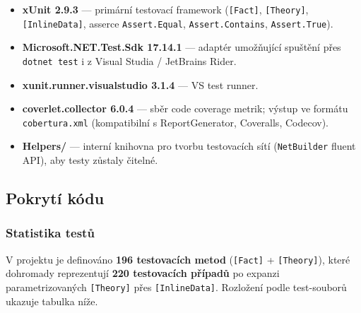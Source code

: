 \documentclass[12pt,a4paper]{article}
\begin{document}
\begin{itemize}
    \item \textbf{xUnit 2.9.3} — primární testovací framework
          (\texttt{[Fact]}, \texttt{[Theory]}, \texttt{[InlineData]},
          asserce \texttt{Assert.Equal}, \texttt{Assert.Contains},
          \texttt{Assert.True}).
    \item \textbf{Microsoft.NET.Test.Sdk 17.14.1} — adaptér umožňující
          spuštění přes \texttt{dotnet test} i z Visual Studia / JetBrains
          Rider.
    \item \textbf{xunit.runner.visualstudio 3.1.4} — VS test runner.
    \item \textbf{coverlet.collector 6.0.4} — sběr code coverage metrik;
          výstup ve formátu \texttt{cobertura.xml} (kompatibilní s ReportGenerator,
          Coveralls, Codecov).
    \item \textbf{Helpers/} — interní knihovna pro tvorbu testovacích
          sítí (\texttt{NetBuilder} fluent API), aby testy zůstaly čitelné.
\end{itemize}

\subsection{Pokrytí kódu}

\subsubsection{Statistika testů}

V projektu je definováno \textbf{196 testovacích metod}
(\texttt{[Fact]} + \texttt{[Theory]}), které dohromady reprezentují
\textbf{220 testovacích případů} po expanzi parametrizovaných
\texttt{[Theory]} přes \texttt{[InlineData]}. Rozložení podle
test-souborů ukazuje tabulka níže.
\end{document}

